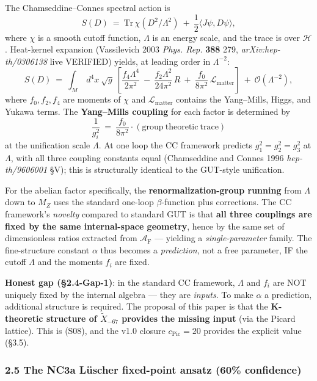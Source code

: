 \documentclass[
  11pt,
  a4paper,
]{article}
\begin{document}
The Chamseddine--Connes spectral action is
\[
S(D)\ =\ \mathrm{Tr}\,\chi(D^2/\Lambda^2)\ +\ \frac{1}{2}\langle J\psi, D\psi\rangle,
\]
where \(\chi\) is a smooth cutoff function, \(\Lambda\) is an energy scale, and the trace is over \(\mathcal H\). Heat-kernel expansion (Vassilevich 2003 \emph{Phys. Rep.} \textbf{388} 279, \emph{arXiv:hep-th/0306138} live VERIFIED) yields, at leading order in \(\Lambda^{-2}\):
\[
S(D)\ =\ \int_M\ d^4x\ \sqrt g\ \left[\frac{f_4 \Lambda^4}{2\pi^2}\ -\ \frac{f_2 \Lambda^2}{24\pi^2}\,R\ +\ \frac{f_0}{8\pi^2}\,\mathcal L_{\mathrm{matter}}\right]\ +\ \mathcal O(\Lambda^{-2}),
\]
where \(f_0, f_2, f_4\) are moments of \(\chi\) and \(\mathcal L_{\mathrm{matter}}\) contains the Yang--Mills, Higgs, and Yukawa terms. The \textbf{Yang--Mills coupling} for each factor is determined by
\[
\frac{1}{g_i^2}\ =\ \frac{f_0}{8\pi^2}\cdot \mathrm{(group\ theoretic\ trace)}
\]
at the unification scale \(\Lambda\). At one loop the CC framework predicts \(g_1^2 = g_2^2 = g_3^2\) at \(\Lambda\), with all three coupling constants equal (Chamseddine and Connes 1996 \emph{hep-th/9606001} §V); this is structurally identical to the GUT-style unification.

For the abelian factor specifically, the \textbf{renormalization-group running} from \(\Lambda\) down to \(M_Z\) uses the standard one-loop \(\beta\)-function plus corrections. The CC framework's \emph{novelty} compared to standard GUT is that \textbf{all three couplings are fixed by the same internal-space geometry}, hence by the same set of dimensionless ratios extracted from \(\mathcal A_{\mathrm F}\) --- yielding a \emph{single-parameter} family. The fine-structure constant \(\alpha\) thus becomes a \emph{prediction}, not a free parameter, IF the cutoff \(\Lambda\) and the moments \(f_i\) are fixed.

\textbf{Honest gap (§2.4-Gap-1)}: in the standard CC framework, \(\Lambda\) and \(f_i\) are NOT uniquely fixed by the internal algebra --- they are \emph{inputs}. To make \(\alpha\) a prediction, additional structure is required. The proposal of this paper is that the \textbf{K-theoretic structure of \(\tilde X_{-67}\) provides the missing input} (via the Picard lattice). This is (S08), and the v1.0 closure \(c_{\mathrm{Pic}} = 20\) provides the explicit value (§3.5).

\hypertarget{the-nc3a-luxfcscher-fixed-point-ansatz-60-confidence}{%
\subsubsection{2.5 The NC3a Lüscher fixed-point ansatz (60\% confidence)}\label{the-nc3a-luxfcscher-fixed-point-ansatz-60-confidence}}
\end{document}
